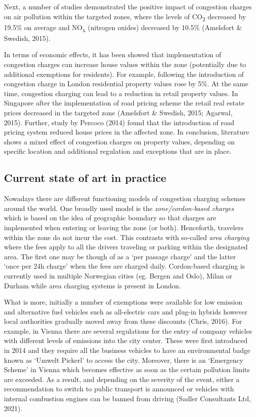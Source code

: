 \documentclass[
]{book}
\begin{document}
Next, a number of studies demonstrated the positive impact of congestion charges on air pollution within the targeted zones, where the levels of CO\textsubscript{2} decreased by 19.5\% on average and NO\textsubscript{x} (nitrogen oxides) decreased by 10.5\% (Amelsfort \& Swedish, 2015).

In terms of economic effects, it has been showed that implementation of congestion charges can increase house values within the zone (potentially due to additional exemptions for residents). For example, following the introduction of congestion charge in London residential property values rose by 5\%. At the same time, congestion charging can lead to a reduction in retail property values. In Singapore after the implementation of road pricing scheme the retail real estate prices decreased in the targeted zone (Amelsfort \& Swedish, 2015; Agarwal, 2015). Further, study by Percoco (2014) found that the introduction of road pricing system reduced house prices in the affected zone. In conclusion, literature shows a mixed effect of congestion charges on property values, depending on specific location and additional regulation and exceptions that are in place.

\hypertarget{current-state-of-art-in-practice-3}{%
\subsection*{Current state of art in practice}\label{current-state-of-art-in-practice-3}}

Nowadays there are different functioning models of congestion charging schemes around the world. One broadly used model is the \emph{zone/cordon-based charges} which is based on the idea of geographic boundary so that charges are implemented when entering or leaving the zone (or both). Henceforth, travelers within the zone do not incur the cost. This contrasts with so-called \emph{area charging} where the fees apply to all the drivers traveling or parking within the designated area. The first one may be though of as a `per passage charge' and the latter `once per 24h charge' when the fees are charged daily. Cordon-based charging is currently used in multiple Norwegian cities (eg. Bergen and Oslo), Milan or Durham while area charging systems is present in London.

What is more, initially a number of exemptions were available for low emission and alternative fuel vehicles such as all-electric cars and plug-in hybrids however local authorities gradually moved away from these discounts (Chris, 2016). For example, in Vienna there are several regulations for the entry of company vehicles with different levels of emissions into the city center. These were first introduced in 2014 and they require all the business vehicles to have an environmental badge known as `Umwelt Pickerl' to access the city. Moreover, there is an `Emergency Scheme' in Vienna which becomes effective as soon as the certain pollution limits are exceeded. As a result, and depending on the severity of the event, either a recommendation to switch to public transport is announced or vehicles with internal combustion engines can be banned from driving (Sadler Consultants Ltd, 2021).
\end{document}
